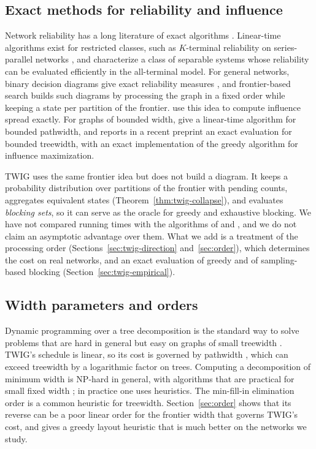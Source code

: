 \documentclass[11pt]{article}
\theoremstyle{definition}
\theoremstyle{remark}
\begin{document}
\subsection{Exact methods for reliability and influence}

Network reliability has a long literature of exact algorithms \citep{colbourn1987}. Linear-time algorithms exist for restricted classes, such as $K$-terminal reliability on series-parallel networks \citep{satyanarayana1985}, and \citet{cancela2021} characterize a class of separable systems whose reliability can be evaluated efficiently in the all-terminal model. For general networks, binary decision diagrams give exact reliability measures \citep{hardy2007}, and frontier-based search \citep{kawahara2017} builds such diagrams by processing the graph in a fixed order while keeping a state per partition of the frontier. \citet{maehara2017} use this idea to compute influence spread exactly. For graphs of bounded width, \citet{nakamura2026} give a linear-time algorithm for bounded pathwidth, and \citet{pozar2026} reports in a recent preprint an exact evaluation for bounded treewidth, with an exact implementation of the greedy algorithm for influence maximization.

TWIG uses the same frontier idea but does not build a diagram. It keeps a probability distribution over partitions of the frontier with pending counts, aggregates equivalent states (Theorem~\ref{thm:twig-collapse}), and evaluates \emph{blocking sets}, so it can serve as the oracle for greedy and exhaustive blocking. We have not compared running times with the algorithms of \citet{nakamura2026} and \citet{pozar2026}, and we do not claim an asymptotic advantage over them. What we add is a treatment of the processing order (Sections~\ref{sec:twig-direction} and~\ref{sec:order}), which determines the cost on real networks, and an exact evaluation of greedy and of sampling-based blocking (Section~\ref{sec:twig-empirical}).

\subsection{Width parameters and orders}

Dynamic programming over a tree decomposition is the standard way to solve problems that are hard in general but easy on graphs of small treewidth \citep{bodlaender1988,cygan2015}. TWIG's schedule is linear, so its cost is governed by pathwidth \citep{kinnersley1992}, which can exceed treewidth by a logarithmic factor on trees. Computing a decomposition of minimum width is NP-hard in general, with algorithms that are practical for small fixed width \citep{bodlaender1996,cygan2015}; in practice one uses heuristics. The min-fill-in elimination order is a common heuristic for treewidth. Section~\ref{sec:order} shows that its reverse can be a poor linear order for the frontier width that governs TWIG's cost, and gives a greedy layout heuristic that is much better on the networks we study.
\end{document}
